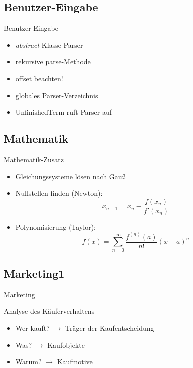\documentclass{beamer}
\begin{document}
\subsection{Benutzer-Eingabe}
\begin{frame}{Benutzer-Eingabe}
	\begin{itemize}
		\item \textit{abstract}-Klasse Parser
		\item rekursive parse-Methode
		\item offset beachten!
		\item globales Parser-Verzeichnis
		\item UnfinishedTerm ruft Parser auf
	\end{itemize}
\end{frame}

\subsection{Mathematik}
\begin{frame}{Mathematik-Zusatz}
	\begin{itemize}
		\item Gleichungssysteme lösen nach Gauß
		\item Nullstellen finden (Newton): \[ x_{n+1}=x_{n}-{\frac {f(x_{n})}{f'(x_{n})}}\]
		\item Polynomisierung (Taylor): \[f(x)=\sum _{n=0}^{\infty }{\frac {f^{(n)}(a)}{n!}}(x-a)^{n}\]
	\end{itemize}
\end{frame}

\subsection{Marketing1}

\begin{frame}{Marketing}

\begin{block}{Analyse des Käuferverhaltens}
	\begin{itemize}
		\item	Wer kauft? \hspace{1.1cm} $\rightarrow$ \hspace{0.5cm} Träger der Kaufentscheidung
		\item	Was? \hspace{2cm} $\rightarrow$ \hspace{0.5cm} Kaufobjekte
		\item	Warum? \hspace{1.52cm} $\rightarrow$ \hspace{0.5cm} Kaufmotive
	\end{itemize}
\end{block}

\end{frame}
\end{document}

